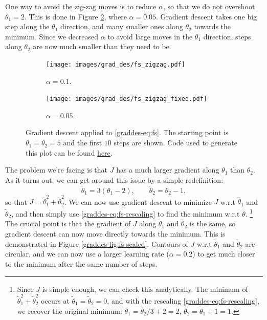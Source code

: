 \documentclass{article}
\theoremstyle{definition}
\begin{document}
One way to avoid the zig-zag moves is to reduce $\alpha$, so that we do not overshoot $\theta_1=2$. This is done in Figure \ref{graddes-fig:fs-zz-fixed}, where $\alpha=0.05$. Gradient descent takes one big step along the $\theta_1$ direction, and many smaller ones along $\theta_2$ towards the minimum. Since we decreased $\alpha$ to avoid large moves in the $\theta_1$ direction, steps along $\theta_2$ are now much smaller than they need to be.


\begin{figure}[ht]
    \begin{subfigure}{\linewidth}
        \centering
        \texttt{[image: images/grad\_des/fs\_zigzag.pdf]}
        \caption{$\alpha=0.1$.}
        \label{graddes-fig:fs-zz}
    \end{subfigure}%
    
    \begin{subfigure}{\linewidth}
        \centering
        \texttt{[image: images/grad\_des/fs\_zigzag\_fixed.pdf]}
        \caption{$\alpha=0.05$.}
        \label{graddes-fig:fs-zz-fixed}
    \end{subfigure}%
    
    \caption{Gradient descent applied to \eqref{graddes-eq:fs}. The starting point is $\theta_1=\theta_2=5$ and the first $10$ steps are shown. Code used to generate this plot can be found \href{https://github.com/siavashaslanbeigi/ml_notes/blob/master/src/grad_des/feature_scaling.ipynb}{\color{blue} here}.}
    \label{graddes-fig:fs-issues}
\end{figure}

The problem we're facing is that $J$ has a much larger gradient along $\theta_1$ than $\theta_2$. As it turns out, we can get around this issue by a simple redefinition:
\begin{equation}
    \tilde{\theta}_1 = 3(\theta_1-2), \qquad
    \tilde{\theta}_2 = \theta_2-1,
    \label{graddes-eq:fs-rescaling}
\end{equation}
so that $J=\tilde{\theta}_1^2 + \tilde{\theta}_2^2$. We can now use gradient descent to minimize $J$ w.r.t $\tilde{\theta}_1$ and $\tilde{\theta}_2$, and then simply use \eqref{graddes-eq:fs-rescaling} to find the minimum w.r.t $\theta$.
\footnote{
Since $J$ is simple enough, we can check this analytically. The minimum of $\tilde{\theta}_1^2 + \tilde{\theta}_2^2$ occurs at $\tilde{\theta}_1=\tilde{\theta}_2=0$, and with the rescaling \eqref{graddes-eq:fs-rescaling}, we recover the original minimum: $\theta_1 = \tilde{\theta}_2/3+2=2$, $\theta_2 = \tilde{\theta}_1+1=1$.
}
The crucial point is that the gradient of $J$ along $\tilde{\theta}_1$ and $\tilde{\theta}_2$ is the same, so gradient descent can now move directly towards the minimum. This is demonstrated in Figure \ref{graddes-fig:fs-scaled}. Contours of $J$ w.r.t $\tilde{\theta}_1$ and $\tilde{\theta}_2$ are circular, and we can now use a larger learning rate ($\alpha=0.2$) to get much closer to the minimum after the same number of steps.
\end{document}
